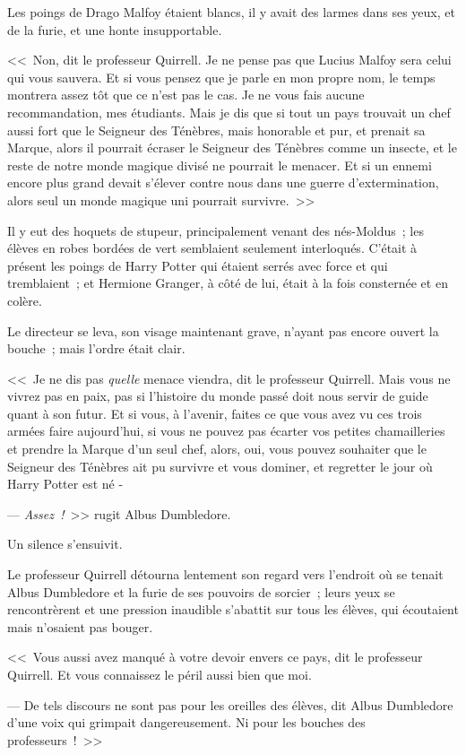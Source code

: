 Les poings de Drago Malfoy étaient blancs, il y avait des larmes dans ses yeux, et de la furie, et une honte insupportable.

<<~Non, dit le professeur Quirrell. Je ne pense pas que Lucius Malfoy sera celui qui vous sauvera. Et si vous pensez que je parle en mon propre nom, le temps montrera assez tôt que ce n'est pas le cas. Je ne vous fais aucune recommandation, mes étudiants. Mais je dis que si tout un pays trouvait un chef aussi fort que le Seigneur des Ténèbres, mais honorable et pur, et prenait sa Marque, alors il pourrait écraser le Seigneur des Ténèbres comme un insecte, et le reste de notre monde magique divisé ne pourrait le menacer. Et si un ennemi encore plus grand devait s'élever contre nous dans une guerre d'extermination, alors seul un monde magique uni pourrait survivre.~>>

Il y eut des hoquets de stupeur, principalement venant des nés-Moldus~; les élèves en robes bordées de vert semblaient seulement interloqués. C'était à présent les poings de Harry Potter qui étaient serrés avec force et qui tremblaient~; et Hermione Granger, à côté de lui, était à la fois consternée et en colère.

Le directeur se leva, son visage maintenant grave, n'ayant pas encore ouvert la bouche~; mais l'ordre était clair.

<<~Je ne dis pas \emph{quelle} menace viendra, dit le professeur Quirrell. Mais vous ne vivrez pas en paix, pas si l'histoire du monde passé doit nous servir de guide quant à son futur. Et si vous, à l'avenir, faites ce que vous avez vu ces trois armées faire aujourd'hui, si vous ne pouvez pas écarter vos petites chamailleries et prendre la Marque d'un seul chef, alors, oui, vous pouvez souhaiter que le Seigneur des Ténèbres ait pu survivre et vous dominer, et regretter le jour où Harry Potter est né -

--- \emph{Assez~!}~>> rugit Albus Dumbledore.

Un silence s'ensuivit.

Le professeur Quirrell détourna lentement son regard vers l'endroit où se tenait Albus Dumbledore et la furie de ses pouvoirs de sorcier~; leurs yeux se rencontrèrent et une pression inaudible s'abattit sur tous les élèves, qui écoutaient mais n'osaient pas bouger.

<<~Vous aussi avez manqué à votre devoir envers ce pays, dit le professeur Quirrell. Et vous connaissez le péril aussi bien que moi.

--- De tels discours ne sont pas pour les oreilles des élèves, dit Albus Dumbledore d'une voix qui grimpait dangereusement. Ni pour les bouches des professeurs~!~>>

